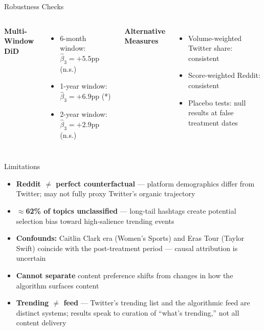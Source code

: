 \documentclass[aspectratio=169]{beamer}
\begin{document}
\begin{frame}{Robustness Checks}

\begin{columns}[t]

    \textbf{Multi-Window DiD}
    \begin{itemize}
        \item 6-month window: $\hat{\beta}_3 = +5.5$pp (n.s.)
        \item 1-year window: $\hat{\beta}_3 = +6.9$pp (*)
        \item 2-year window: $\hat{\beta}_3 = +2.9$pp (n.s.)
    \end{itemize}

    \vspace{0.5em}
    \textbf{Alternative Measures}
    \begin{itemize}
        \item Volume-weighted Twitter share: consistent
        \item Score-weighted Reddit: consistent
        \item Placebo tests: null results at false treatment dates
    \end{itemize}
\end{columns}
\end{frame}

\begin{frame}{Limitations}
\begin{itemize}
    \item \textbf{Reddit $\neq$ perfect counterfactual} --- platform demographics differ from Twitter; may not fully proxy Twitter's organic trajectory
    \vspace{0.4em}
    \item \textbf{$\approx$62\% of topics unclassified} --- long-tail hashtags create potential selection bias toward high-salience trending events
    \vspace{0.4em}
    \item \textbf{Confounds:} Caitlin Clark era (Women's Sports) and Eras Tour (Taylor Swift) coincide with the post-treatment period --- causal attribution is uncertain
    \vspace{0.4em}
    \item \textbf{Cannot separate} content preference shifts from changes in how the algorithm surfaces content
    \vspace{0.4em}
    \item \textbf{Trending $\neq$ feed} --- Twitter's trending list and the algorithmic feed are distinct systems; results speak to curation of ``what's trending,'' not all content delivery
\end{itemize}
\end{frame}
\end{document}
